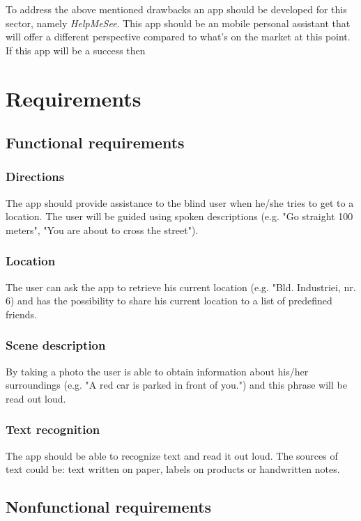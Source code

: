 \documentclass{article}[11]
\begin{document}
	To address the above mentioned drawbacks an app should be developed for this sector, namely \emph{HelpMeSee}. This app should be an mobile personal assistant  that will offer a different perspective compared to what's on the market at this point. If this app will be a success then
	
	
	\newpage

\section{Requirements}

\subsection{Functional requirements}

\subsubsection{Directions}
	The app should provide assistance to the blind user when he/she tries to get to a location. The user will be guided using spoken descriptions (e.g. "Go straight 100 meters", "You are about to cross the street").
	
\subsubsection{Location}
	The user can ask the app to retrieve his current location (e.g. "Bld. Industriei, nr. 6) and has the possibility to share his current location to a list of predefined friends.
	
\subsubsection{Scene description}
	By taking a photo the user is able to obtain information about his/her surroundings (e.g. "A red car is parked in front of you.") and this phrase will be read out loud.
	
\subsubsection{Text recognition}
	The app should be able to recognize text and read it out loud. The sources of text could be: text written on paper, labels on products or handwritten notes.
	
	
\subsection{Nonfunctional requirements}
\end{document}
